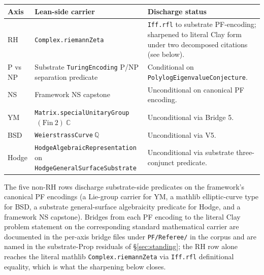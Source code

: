 \documentclass[11pt,a4paper]{amsart}
\theoremstyle{plain}
\theoremstyle{definition}
\begin{document}
\begin{center}
\footnotesize
\renewcommand{\arraystretch}{1.15}
\begin{tabular}{@{}p{1.5cm}p{4.3cm}p{6.5cm}@{}}
\toprule
\textbf{Axis} & \textbf{Lean-side carrier} & \textbf{Discharge status} \\
\midrule
RH        & \texttt{Complex.riemannZeta}                              & \texttt{Iff.rfl} to substrate PF-encoding; sharpened to literal Clay form under two decomposed citations (see below). \\
P vs NP   & Substrate \texttt{TuringEncoding} P/NP separation predicate & Conditional on \texttt{PolylogEigenvalueConjecture}. \\
NS        & Framework NS capstone                                     & Unconditional on canonical PF encoding. \\
YM        & \texttt{Matrix.specialUnitaryGroup}$~(\mathrm{Fin}~2)~\mathbb{C}$ & Unconditional via Bridge 5. \\
BSD       & \texttt{WeierstrassCurve}$~\mathbb{Q}$                    & Unconditional via V5. \\
Hodge     & \texttt{HodgeAlgebraicRepresentation} on \texttt{HodgeGeneralSurfaceSubstrate} & Unconditional via substrate three-conjunct predicate. \\
\bottomrule
\end{tabular}
\end{center}

The five non-RH rows discharge substrate-side predicates on the framework's canonical PF encodings (a Lie-group carrier for YM, a mathlib elliptic-curve type for BSD, a substrate general-surface algebraicity predicate for Hodge, and a framework NS capstone). Bridges from each PF encoding to the literal Clay problem statement on the corresponding standard mathematical carrier are documented in the per-axis bridge files under \texttt{PF/Referee/} in the corpus and are named in the substrate-Prop residuals of \S\ref{sec:standing}; the RH row alone reaches the literal mathlib \texttt{Complex.riemannZeta} via \texttt{Iff.rfl} definitional equality, which is what the sharpening below closes.
\end{document}
